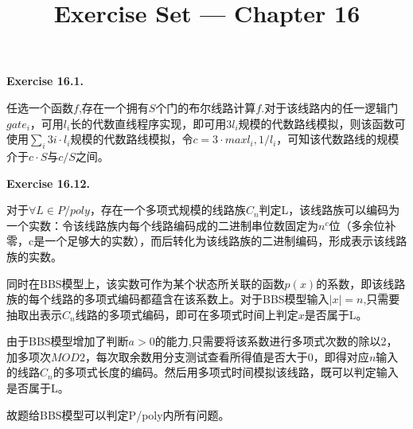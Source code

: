 \documentclass[a4paper]{article}
\title{Exercise Set --- Chapter 16}
\date{}
\newenvironment{exercise}[1]{
	\par
	\noindent\textbf{Exercise #1.}\quad
}{
	\par
	\bigskip
}
\begin{document}
    \maketitle

    \begin{exercise}{16.1}
		任选一个函数$f$,存在一个拥有$S$个门的布尔线路计算$f$.对于该线路内的任一逻辑门$gate_i$，可用$l_i$长的代数直线程序实现，即可用$3l_i$规模的代数路线模拟，则该函数可使用$\sum_i 3i\cdot l_i$规模的代数路线模拟，令$c=3\cdot max{l_i,1/l_i}$，可知该代数路线的规模介于$c\cdot S$与$c/S$之间。
	\end{exercise}

	\begin{exercise}{16.12}
		对于$\forall L\in P/poly$，存在一个多项式规模的线路族${C_n}$判定L，该线路族可以编码为一个实数：令该线路族内每个线路编码成的二进制串位数固定为$n^c$位（多余位补零，c是一个足够大的实数），而后转化为该线路族的二进制编码，形成表示该线路族的实数。
		
		同时在BBS模型上，该实数可作为某个状态所关联的函数$p(x)$的系数，即该线路族的每个线路的多项式编码都蕴含在该系数上。对于BBS模型输入$|x|=n$,只需要抽取出表示$C_n$线路的多项式编码，即可在多项式时间上判定$x$是否属于L。
		
		由于BBS模型增加了判断$a>0$的能力,只需要将该系数进行多项式次数的除以2，加多项次$MOD 2$，每次取余数用分支测试查看所得值是否大于0，即得对应$n$输入的线路$C_n$的多项式长度的编码。然后用多项式时间模拟该线路，既可以判定输入是否属于L。
		
		故题给BBS模型可以判定P/poly内所有问题。		
	\end{exercise}
\end{document}
